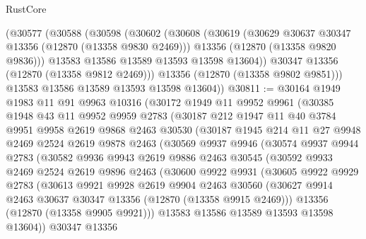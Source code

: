 \begin{lexlean}{RustCore}
\begin{coremodule}
      (@30577
        (@30588
          (@30598
            (@30602
              (@30608
                (@30619
                  (@30629 @30637 @30347 @13356 (@12870 (@13358 @9830 @2469)))
                  @13356
                  (@12870 (@13358 @9820 @9836)))
                @13583
                @13586
                @13589
                @13593
                @13598
                @13604))
            @30347
            @13356
            (@12870 (@13358 @9812 @2469)))
          @13356
          (@12870 (@13358 @9802 @9851)))
        @13583
        @13586
        @13589
        @13593
        @13598
        @13604))
@30811 := @30164
    @1949
    @1983
    @11
    @91
    @9963
    @10316
    (@30172
      @1949
      @11
      @9952
      @9961
      (@30385
        @1948
        @43
        @11
        @9952
        @9959
        @2783
        (@30187
          @212
          @1947
          @11
          @40
          @3784
          @9951
          @9958
          @2619
          @9868
          @2463
          @30530
          (@30187
            @1945
            @214
            @11
            @27
            @9948
            @2469
            @2524
            @2619
            @9878
            @2463
            (@30569
              @9937
              @9946
              (@30574
                @9937
                @9944
                @2783
                (@30582
                  @9936
                  @9943
                  @2619
                  @9886
                  @2463
                  @30545
                  (@30592
                    @9933
                    @2469
                    @2524
                    @2619
                    @9896
                    @2463
                    (@30600
                      @9922
                      @9931
                      (@30605
                        @9922
                        @9929
                        @2783
                        (@30613
                          @9921
                          @9928
                          @2619
                          @9904
                          @2463
                          @30560
                          (@30627 @9914 @2463 @30637 @30347 @13356 (@12870 (@13358 @9915 @2469)))
                          @13356
                          (@12870 (@13358 @9905 @9921)))
                        @13583
                        @13586
                        @13589
                        @13593
                        @13598
                        @13604))
                    @30347
                    @13356

\end{coremodule}
\end{lexlean}
